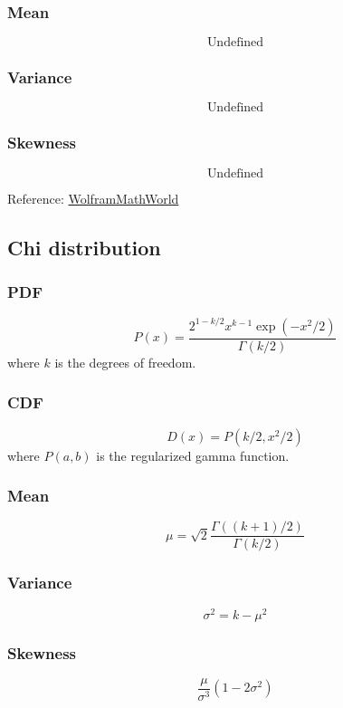 \subsubsection*{Mean}
\[
    \text{Undefined}
\]

\subsubsection*{Variance}
\[
    \text{Undefined}
\]

\subsubsection*{Skewness}
\[
    \text{Undefined}
\]

Reference:
\href{https://mathworld.wolfram.com/CauchyDistribution.html}{WolframMathWorld}

\subsection{Chi distribution} 

\subsubsection*{PDF}
\[
    P(x) = \frac{2^{1-k/2} x^{k-1} \exp{(-x^2/2)}}{\Gamma(k/2)}
\]
where $k$ is the degrees of freedom.

\subsubsection*{CDF}
\[
    D(x) = P(k/2, x^2/2)
\]
where $P(a,b)$ is the regularized gamma function.

\subsubsection*{Mean}
\[
    \mu = \sqrt{2} \frac{\Gamma((k+1)/2)}{\Gamma(k/2)}
\]

\subsubsection*{Variance}
\[
    \sigma^2 = k-\mu^2
\]

\subsubsection*{Skewness}
\[
    \frac{\mu}{\sigma^3} (1-2\sigma^2)
\]

